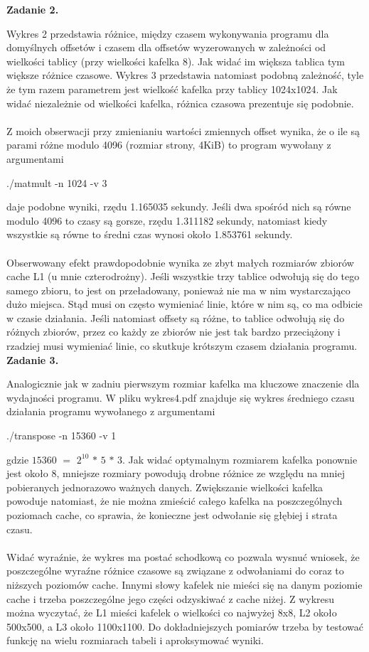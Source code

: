 \documentclass[a4paper]{article}
\begin{document}
\textbf{Zadanie 2.}

Wykres 2 przedstawia różnice, między czasem wykonywania programu dla domyślnych offsetów i czasem dla offsetów wyzerowanych w zależności od wielkości tablicy (przy wielkości kafelka 8). Jak widać im większa tablica tym większe różnice czasowe. Wykres 3 przedstawia natomiast podobną zależność, tyle że tym razem parametrem jest wielkość kafelka przy tablicy 1024x1024. Jak widać niezależnie od wielkości kafelka, różnica czasowa prezentuje się podobnie.\\\\
Z moich obserwacji przy zmienianiu wartości zmiennych offset wynika, że o ile są parami różne modulo 4096 (rozmiar strony, 4KiB) to program wywołany z argumentami
\begin{center}
./matmult -n 1024 -v 3
\end{center}
daje podobne wyniki, rzędu 1.165035 sekundy. Jeśli dwa spośród nich są równe modulo 4096 to czasy są gorsze, rzędu 1.311182 sekundy, natomiast kiedy wszystkie są równe to średni czas wynosi około 1.853761 sekundy.\\\\
Obserwowany efekt prawdopodobnie wynika ze zbyt małych rozmiarów zbiorów cache L1 (u mnie czterodrożny). Jeśli wszystkie trzy tablice odwołują się do tego samego zbioru, to jest on przeładowany, ponieważ nie ma w nim wystarczająco dużo miejsca. Stąd musi on często wymieniać linie, które w nim są, co ma odbicie w czasie działania. Jeśli natomiast offsety są różne, to tablice odwołują się do różnych zbiorów, przez co każdy ze zbiorów nie jest tak bardzo przeciążony i rzadziej musi wymieniać linie, co skutkuje krótszym czasem działania programu.\\

\newpage
\textbf{Zadanie 3.}

Analogicznie jak w zadniu pierwszym rozmiar kafelka ma kluczowe znaczenie dla wydajności programu. W pliku wykres4.pdf znajduje się wykres średniego czasu działania programu wywołanego z argumentami 
\begin{center}
./transpose -n 15360 -v 1
\end{center}
gdzie $15360$ $=$ $2^{10}$ $*$ $5$ $*$ $3$. Jak widać optymalnym rozmiarem kafelka ponownie jest około 8, mniejsze rozmiary powodują drobne różnice ze względu na mniej pobieranych jednorazowo ważnych danych. Zwiększanie wielkości kafelka powoduje natomiast, że nie można zmieścić całego kafelka na poszczególnych poziomach cache, co sprawia, że konieczne jest odwołanie się głębiej i strata czasu.\\\\
Widać wyraźnie, że wykres ma postać schodkową co pozwala wysnuć wniosek, że poszczególne wyraźne różnice czasowe są związane z odwołaniami do coraz to niższych poziomów cache. Innymi słowy kafelek nie mieści się na danym poziomie cache i trzeba poszczególne jego części odzyskiwać z cache niżej. Z wykresu można wyczytać, że L1 mieści kafelek o wielkości co najwyżej 8x8, L2 około 500x500, a L3 około 1100x1100. Do dokładniejszych pomiarów trzeba by testować funkcję na wielu rozmiarach tabeli i aproksymować wyniki.\\\\
\end{document}
